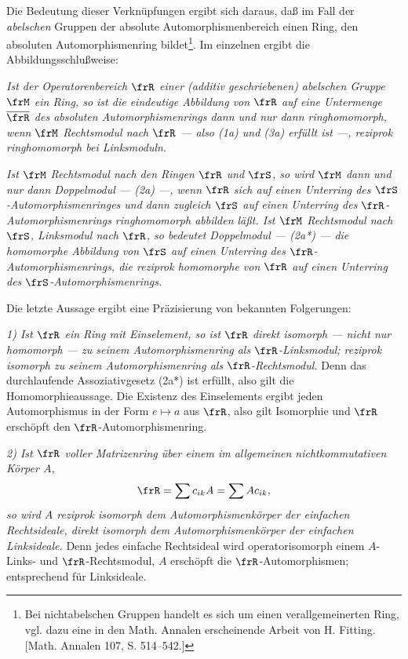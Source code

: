 Die Bedeutung dieser Verknüpfungen ergibt sich daraus, daß im Fall der \emph{abelschen} Gruppen der absolute Automorphismenbereich einen Ring, den absoluten Automorphismenring bildet\footnote{Bei nichtabelschen Gruppen handelt es sich um einen \glqq{}verallgemeinerten\grqq{} Ring, vgl. dazu eine in den Math. Annalen erscheinende Arbeit von H. Fitting. [Math. Annalen 107, S. 514--542.]}. Im einzelnen ergibt die Abbildungsschlußweise:

\emph{Ist der Operatorenbereich \(\frR\) einer (additiv geschriebenen) abelschen Gruppe \(\frM\) ein Ring, so ist die eindeutige Abbildung von \(\frR\) auf eine Untermenge \(\overline{\frR}\) des absoluten Automorphismenrings dann und nur dann ringhomomorph, wenn \(\frM\) Rechtsmodul nach \(\frR\) --- also (1a) und (3a) erfüllt ist ---, reziprok ringhomomorph bei Linksmoduln.}

\emph{Ist \(\frM\) Rechtsmodul nach den Ringen \(\frR\) und \(\frS\), so wird \(\frM\) dann und nur dann Doppelmodul --- (2a) ---, wenn \(\frR\) sich auf einen Unterring des \(\frS\)-Automorphismenringes und dann zugleich \(\frS\) auf einen Unterring des \(\frR\)-Automorphismenrings ringhomomorph abbilden läßt. Ist \(\frM\) Rechtsmodul nach \(\frS\), Linksmodul nach \(\frR\), so bedeutet Doppelmodul --- (2a*) --- die homomorphe Abbildung von \(\frS\) auf einen Unterring des \(\frR\)-Automorphismenrings, die reziprok homomorphe von \(\frR\) auf einen Unterring des \(\frS\)-Automorphismenrings.}

Die letzte Aussage ergibt eine Präzisierung von bekannten Folgerungen:

\emph{1) Ist \(\frR\) ein Ring mit Einselement, so ist \(\frR\) direkt isomorph --- nicht nur homomorph --- zu seinem Automorphismenring als \(\frR\)-Linksmodul; reziprok isomorph zu seinem Automorphismenring als \(\frR\)-Rechtsmodul.} Denn das durchlaufende Assoziativgesetz (2a*) ist erfüllt, also gilt die Homomorphieaussage. Die Existenz des Einselements ergibt jeden Automorphismus in der Form \(e\mapsto a\) aus \(\frR\), also gilt Isomorphie und \(\frR\) erschöpft den \(\frR\)-Automorphismenring.

\emph{2) Ist \(\frR\) voller Matrizenring über einem im allgemeinen nichtkommutativen Körper \(A\),}
\[
        \frR=\sum c_{ik}A=\sum A c_{ik},
\]
\emph{so wird \(A\) reziprok isomorph dem Automorphismenkörper der einfachen Rechtsideale, direkt isomorph dem Automorphismenkörper der einfachen Linksideale.} Denn jedes einfache Rechtsideal wird operatorisomorph einem \(A\)-Links- und \(\frR\)-Rechtsmodul, \(A\) erschöpft die \(\frR\)-Automorphismen; entsprechend für Linksideale.

